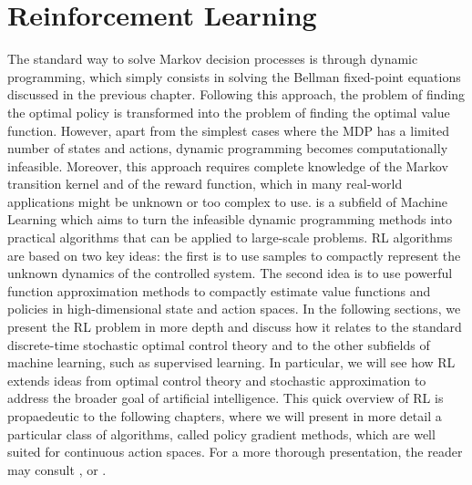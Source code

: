 \chapter{Reinforcement Learning}
\label{ch:reinforcement_learning}

The standard way to solve Markov decision processes is through dynamic programming, which simply consists in solving the Bellman fixed-point equations discussed in the previous chapter. Following this approach, the problem of finding the optimal policy is transformed into the problem of finding the optimal value function. However, apart from the simplest cases where the MDP has a limited number of states and actions, dynamic programming becomes computationally infeasible. Moreover, this approach requires complete knowledge of the Markov transition kernel and of the reward function, which in many real-world applications might be unknown or too complex to use.  is a subfield of Machine Learning which aims to turn the infeasible dynamic programming methods into practical algorithms that can be applied to large-scale problems. \gls{RL} algorithms are based on two key ideas: the first is to use samples to compactly represent the unknown dynamics of the controlled system. The second idea is to use powerful function approximation methods to compactly estimate value functions and policies in high-dimensional state and action spaces. In the following sections, we present the \gls{RL} problem in more depth and discuss how it relates to the standard discrete-time stochastic optimal control theory and to the other subfields of machine learning, such as supervised learning. In particular, we will see how RL extends ideas from optimal control theory and stochastic approximation to address the broader goal of artificial intelligence. This quick overview of RL is propaedeutic to the following chapters, where we will present in more detail a particular class of algorithms, called policy gradient methods, which are well suited for continuous action spaces. For a more thorough presentation, the reader may consult \cite{sutton1998introduction}, \cite{szepesvari2010algorithms} or \cite{wiering2012reinforcement}.

